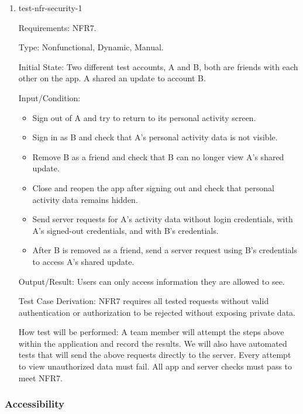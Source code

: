 \documentclass[12pt, titlepage]{article}
\begin{document}
\begin{enumerate}

\item{test-nfr-security-1\\}

Requirements: NFR7.

Type: Nonfunctional, Dynamic, Manual.

Initial State: Two different test accounts, A and B, both are friends
with each other on the app. A shared an update to account B.

Input/Condition:

\begin{itemize}
    \item Sign out of A and try to return to its personal activity screen.
    \item Sign in as B and check that A's personal activity data is
    not visible.
    \item Remove B as a friend and check that B can no longer view
    A's shared update.
    \item Close and reopen the app after signing out and check that
    personal activity data remains hidden.
    \item Send server requests for A's activity data without login
    credentials, with A's signed-out credentials, and with B's credentials.
    \item After B is removed as a friend, send a server request using
    B's credentials to access A's shared update.
\end{itemize}

Output/Result: Users can only access information they are allowed to see.

Test Case Derivation: NFR7 requires all tested requests without valid
authentication or authorization to be rejected without exposing
private data.

How test will be performed: A team member will attempt the steps above
within the application and record the results. We will also have
automated tests that will send the above requests directly to the server.
Every attempt to view unauthorized data must fail. All app and server
checks must pass to meet NFR7.

\end{enumerate}

\subsubsection{Accessibility}
\end{document}
